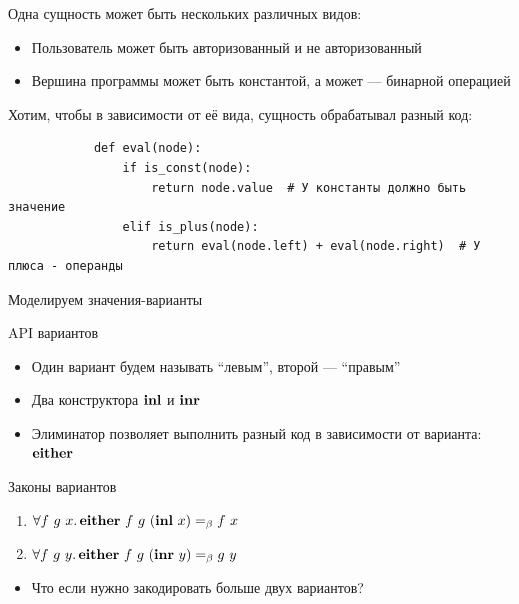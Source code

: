 
    \begin{frame}[fragile]{\subsecname}
        Одна сущность может быть нескольких различных видов:
        \begin{itemize}
            \item Пользователь может быть авторизованный и не авторизованный
            \item Вершина программы может быть константой, а может --- бинарной операцией
        \end{itemize}
        \vspace{1em}
        Хотим, чтобы в зависимости от её вида, сущность обрабатывал разный код:
        \begin{verbatim}
            def eval(node):
                if is_const(node):
                    return node.value  # У константы должно быть значение
                elif is_plus(node):
                    return eval(node.left) + eval(node.right)  # У плюса - операнды
        \end{verbatim}
    \end{frame}

    \begin{frame}[fragile]{Моделируем значения-варианты}
        \pause
        \begin{block}{API вариантов}
            \begin{itemize}
                \item Один вариант будем называть ``левым'', второй --- ``правым''
                \item Два конструктора $\mathbf{inl}$ и $\mathbf{inr}$
                \item Элиминатор позволяет выполнить разный код в зависимости от варианта: $\mathbf{either}$
            \end{itemize}
        \end{block}
        \pause
        \begin{block}{Законы вариантов}
            \begin{enumerate}
                \item $\forall f~g~x \ldotp \mathbf{either} ~ f ~ g ~ (\mathbf{inl} ~ x) =_\beta f ~ x$
                \item $\forall f~g~y \ldotp \mathbf{either} ~ f ~ g ~ (\mathbf{inr} ~ y) =_\beta g ~ y$
            \end{enumerate}
        \end{block}
        \begin{itemize}
            \item[\todo] Что если нужно закодировать больше двух вариантов?
        \end{itemize}
    \end{frame}

